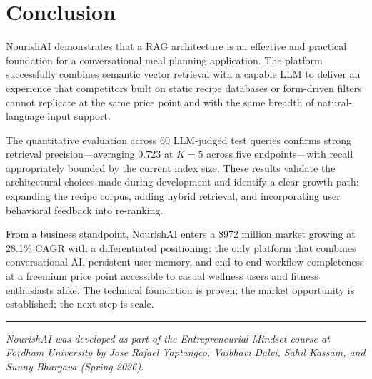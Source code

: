 \documentclass[12pt,letterpaper]{article}
\begin{document}
\section{Conclusion}
\label{sec:conclusion}

NourishAI demonstrates that a RAG architecture is an effective and practical foundation
for a conversational meal planning application. The platform successfully combines
semantic vector retrieval with a capable LLM to deliver an experience that competitors
built on static recipe databases or form-driven filters cannot replicate at the same price
point and with the same breadth of natural-language input support.

The quantitative evaluation across 60 LLM-judged test queries confirms strong retrieval
precision---averaging 0.723 at $K=5$ across five endpoints---with recall appropriately
bounded by the current index size. These results validate the architectural choices made
during development and identify a clear growth path: expanding the recipe corpus, adding
hybrid retrieval, and incorporating user behavioral feedback into re-ranking.

From a business standpoint, NourishAI enters a \$972 million market growing at 28.1\%
CAGR with a differentiated positioning: the only platform that combines conversational AI,
persistent user memory, and end-to-end workflow completeness at a freemium price point
accessible to casual wellness users and fitness enthusiasts alike. The technical
foundation is proven; the market opportunity is established; the next step is scale.

\vspace{1em}
\noindent\rule{\textwidth}{0.4pt}
\vspace{0.5em}

\noindent\textit{NourishAI was developed as part of the Entrepreneurial Mindset course at
Fordham University by Jose Rafael Yaptangco, Vaibhavi Dalvi, Sahil Kassam, and Sunny
Bhargava (Spring 2026).}
\end{document}

